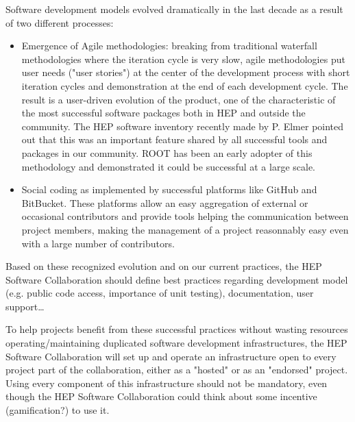 \documentclass[11pt]{article} %
\begin{document}
Software development models evolved dramatically in the last decade as
a result of two different processes:

\begin{itemize}
\item 
Emergence of Agile methodologies: breaking from traditional
waterfall methodologies where the iteration cycle is very slow, agile
methodologies put user needs ("user stories") at the center of the
development process with short iteration cycles and demonstration
at the end of each development cycle.
The result is a user-driven evolution of the product, one of the
characteristic of the most successful software packages both in HEP
and outside the community. 
The HEP software inventory recently made by P. Elmer pointed out that
this was an important feature shared by all successful tools and
packages in our community.
ROOT has been an early adopter of this methodology and demonstrated
it could be successful at a large scale.

\item 
Social coding as implemented by successful platforms like GitHub and
BitBucket.
These platforms allow an easy aggregation of external or occasional
contributors and provide tools helping the communication between
project members, making the management of a project reasonnably
easy even with a large number of contributors.

\end{itemize}

Based on these recognized evolution and on our current practices, the HEP Software Collaboration should define
best practices regarding development model (e.g. public code access, importance of unit testing), documentation, user support\ldots

To help projects benefit from these successful practices without
wasting resources operating/maintaining duplicated software
development infrastructures, the HEP Software Collaboration will set
up and operate an infrastructure open to every project part of the
collaboration, either as a "hosted" or as an "endorsed" project. Using
every component of this infrastructure should not be mandatory, even
though the HEP Software Collaboration could think about some incentive
(gamification?) to use it.
\end{document}
